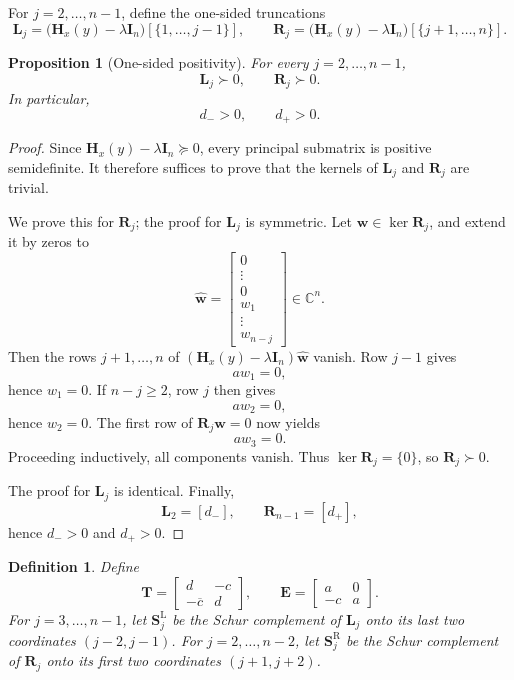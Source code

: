 \documentclass[11pt]{article}
\numberwithin{equation}{section}
\newtheorem{proposition}[theorem]{Proposition}
\newtheorem{definition}[theorem]{Definition}
\begin{document}
For $j=2,\dots,n-1$, define the one-sided truncations
\[
\mathbf L_j
=
\bigl(\mathbf H_x(y)-\lambda\mathbf I_n\bigr)[\{1,\dots,j-1\}],
\qquad
\mathbf R_j
=
\bigl(\mathbf H_x(y)-\lambda\mathbf I_n\bigr)[\{j+1,\dots,n\}].
\]

\begin{proposition}[One-sided positivity]\label{prop:onesided}
For every $j=2,\dots,n-1$,
\[
\mathbf L_j\succ0,
\qquad
\mathbf R_j\succ0.
\]
In particular,
\[
d_->0,
\qquad
d_+>0.
\]
\end{proposition}

\begin{proof}
Since $\mathbf H_x(y)-\lambda\mathbf I_n\succeq0$, every principal submatrix is
positive semidefinite.  It therefore suffices to prove that the kernels of
$\mathbf L_j$ and $\mathbf R_j$ are trivial.

We prove this for $\mathbf R_j$; the proof for $\mathbf L_j$ is symmetric.
Let $\bm w\in\ker\mathbf R_j$, and extend it by zeros to
\[
\widehat{\bm w}=
\begin{bmatrix}
0\\
\vdots\\
0\\
w_1\\
\vdots\\
w_{n-j}
\end{bmatrix}\in\mathbb{C}^n.
\]
Then the rows $j+1,\dots,n$ of
$(\mathbf H_x(y)-\lambda\mathbf I_n)\widehat{\bm w}$ vanish.  Row $j-1$
gives
\[
aw_1=0,
\]
hence $w_1=0$.  If $n-j\ge2$, row $j$ then gives
\[
aw_2=0,
\]
hence $w_2=0$.  The first row of $\mathbf R_j\bm w=0$ now yields
\[
aw_3=0.
\]
Proceeding inductively, all components vanish.  Thus
$\ker\mathbf R_j=\{0\}$, so $\mathbf R_j\succ0$.

The proof for $\mathbf L_j$ is identical.  Finally,
\[
\mathbf L_2=[d_-],
\qquad
\mathbf R_{n-1}=[d_+],
\]
hence $d_->0$ and $d_+>0$.
\end{proof}

\begin{definition}\label{def:edge}
Define
\[
\mathbf T=
\begin{bmatrix}
d & -c\\
-\overline c & d
\end{bmatrix},
\qquad
\mathbf E=
\begin{bmatrix}
a & 0\\
-c & a
\end{bmatrix}.
\]
For $j=3,\dots,n-1$, let $\mathbf S_j^{\mathrm L}$ be the Schur complement of
$\mathbf L_j$ onto its last two coordinates $(j-2,j-1)$.  For
$j=2,\dots,n-2$, let $\mathbf S_j^{\mathrm R}$ be the Schur complement of
$\mathbf R_j$ onto its first two coordinates $(j+1,j+2)$.
\end{definition}
\end{document}
